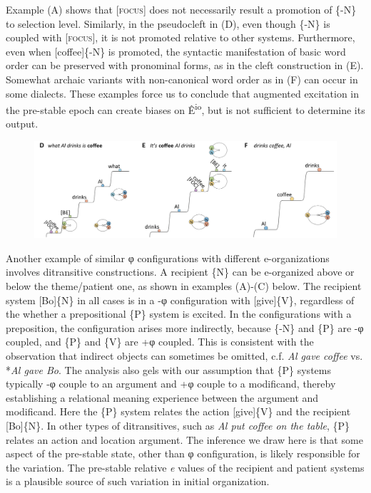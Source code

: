   Example (A) shows that [\textsc{focus}] does not necessarily result a promotion of \{-N\} to selection level. Similarly, in the pseudocleft in (D), even though \{-N\} is coupled with [\textsc{focus}], it is not promoted relative to other systems. Furthermore, even when [coffee]\{-N\} is promoted, the syntactic manifestation of basic word order can be preserved with pronominal forms, as in the cleft construction in (E). Somewhat archaic variants with non-canonical word order as in (F) can occur in some dialects. These examples force us to conclude that augmented excitation in the pre-stable epoch can create biases on Ê\textsuperscript{io}, but is not sufficient to determine its output. 

  
\begin{figure}
\includegraphics[width=\textwidth]{figures/Tilsen-img79.png}
\caption{\missingcaption}
\label{fig:4:29}
\end{figure}
 

  Another example of similar φ configurations with different e-organizations involves ditransitive constructions. A recipient \{N\} can be e-organized above or below the theme/patient one, as shown in examples (A)-(C) below. The recipient system [Bo]\{N\} in all cases is in a -φ configuration with [give]\{V\}, regardless of the whether a prepositional \{P\} system is excited. In the configurations with a preposition, the configuration arises more indirectly, because \{-N\} and \{P\} are -φ coupled, and \{P\} and \{V\} are +φ coupled. This is consistent with the observation that indirect objects can sometimes be omitted, c.f. \textit{Al gave coffee} vs. *\textit{Al gave Bo}. The analysis also gels with our assumption that \{P\} systems typically -φ couple to an argument and +φ couple to a modificand, thereby establishing a relational meaning experience between the argument and modificand. Here the \{P\} system relates the action [give]\{V\} and the recipient [Bo]\{N\}. In other types of ditransitives, such as \textit{Al put coffee on the table}, \{P\} relates an action and location argument. The inference we draw here is that some aspect of the pre-stable state, other than φ configuration, is likely responsible for the variation. The pre-stable relative \textit{e} values of the recipient and patient systems is a plausible source of such variation in initial organization.

